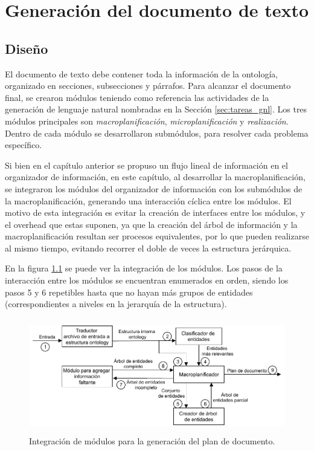 \chapter{Generación del documento de texto}

\section{Diseño}
El documento de texto debe contener toda la información de la ontología, organizado en secciones, subsecciones y párrafos. Para alcanzar el documento final, se crearon módulos teniendo como referencia las actividades de la generación de lenguaje natural nombradas en la Sección \ref{sec:tareas_gnl}. Los tres módulos principales son \emph{macroplanificación}, \emph{microplanificación} y \emph{realización}. Dentro de cada módulo se desarrollaron submódulos, para resolver cada problema específico. 

Si bien en el capítulo anterior se propuso un flujo lineal de información en el organizador de información, en este capítulo, al desarrollar la macroplanificación, se integraron los módulos del organizador de información con los submódulos de la macroplanificación, generando una interacción cíclica entre los módulos. El motivo de esta integración es evitar la creación de interfaces entre los módulos, y el overhead que estas suponen, ya que la creación del árbol de información y la macroplanificación resultan ser procesos equivalentes, por lo que pueden realizarse al mismo tiempo, evitando recorrer el doble de veces la estructura jerárquica. 

En la figura \ref{fig:modulos_plan_documento} se puede ver la integración de los módulos. Los pasos de la interacción entre los módulos se encuentran enumerados en orden, siendo los pasos 5 y 6 repetibles hasta que no hayan más grupos de entidades (correspondientes a niveles en la jerarquía de la estructura).

\begin{figure}[H]
    \centering
    \includegraphics[width=12cm, height=5cm]{img/generacion_documento/modulos_plan_documento.pdf}
    \caption{Integración de módulos para la generación del plan de documento.}
    \label{fig:modulos_plan_documento}
\end{figure}


